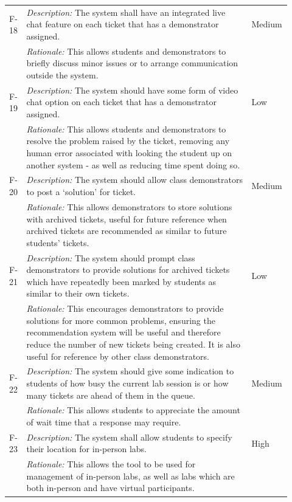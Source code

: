 \begin{table}[H]
\begin{tabular}{|p{0.05\linewidth} | p{0.78\linewidth} |p{0.09\linewidth}|}
   \hline\hline
 F-18 & \textit{Description:} The system shall have an integrated live chat feature on each ticket that has a demonstrator assigned. & Medium\\
  \cline{2-2}
  & \textit{Rationale:} This allows students and demonstrators to briefly discuss minor issues or to arrange communication outside the system. & \\

   \hline\hline
 F-19 & \textit{Description:} The system should have some form of video chat option on each ticket that has a demonstrator assigned. & Low\\
  \cline{2-2}
  & \textit{Rationale:} This allows students and demonstrators to resolve the problem raised by the ticket, removing any human error associated with looking the student up on another system - as well as reducing time spent doing so. & \\

   \hline\hline
 F-20 & \textit{Description:} The system should allow class demonstrators to post a `solution' for ticket. & Medium\\
  \cline{2-2}
  & \textit{Rationale:} This allows demonstrators to store solutions with archived tickets, useful for future reference when archived tickets are recommended as similar to future students' tickets. & \\

   \hline\hline
 F-21 & \textit{Description:} The system should prompt class demonstrators to provide solutions for archived tickets which have repeatedly been marked by students as similar to their own tickets. & Low\\
  \cline{2-2}
  & \textit{Rationale:} This encourages demonstrators to provide solutions for more common problems, ensuring the recommendation system will be useful and therefore reduce the number of new tickets being created. It is also useful for reference by other class demonstrators. & \\

  
     \hline\hline
 F-22 & \textit{Description:} The system should give some indication to students of how busy the current lab session is or how many tickets are ahead of them in the queue. & Medium\\
  \cline{2-2}
  & \textit{Rationale:} This allows students to appreciate the amount of wait time that a response may require. & \\

     \hline\hline
 F-23 & \textit{Description:} The system shall allow students to specify their location for in-person labs. & High\\
  \cline{2-2}
  & \textit{Rationale:} This allows the tool to be used for management of in-person labs, as well as labs which are both in-person and have virtual participants. & \\
 

\end{tabular}
\end{table}
